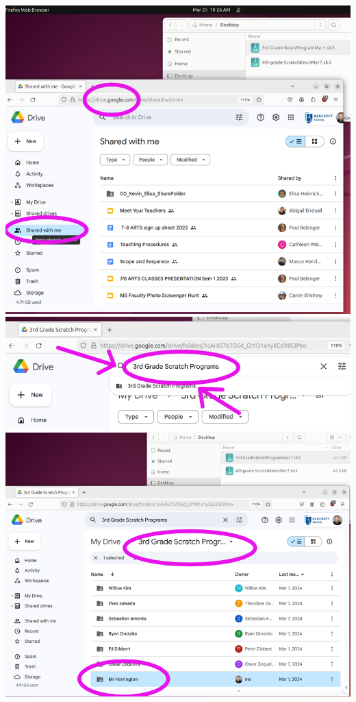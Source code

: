 \documentclass{article}
\begin{document}
\begin{enumerate}
\centerline{ \includegraphics[scale=.20]{7.png} \includegraphics[scale=.25]{8.png}
	\includegraphics[scale=.20]{9.png} }



\end{enumerate}
\end{document}
